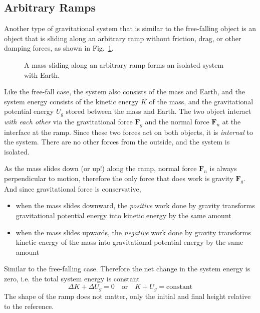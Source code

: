 \subsection{Arbitrary Ramps}
Another type of gravitational system that is similar to the free-falling
object is an object that is sliding along an arbitrary ramp without friction,
drag, or other damping forces, as shown in Fig.~\ref{fig:ramp-system}.
\begin{figure}[ht]
  \centering
  \caption{A mass sliding along an arbitrary ramp forms an isolated system
    with Earth.}
  \label{fig:ramp-system}
\end{figure}
Like the free-fall case, the system also consists of the mass and Earth, and
the system energy consists of the kinetic energy $K$ of the mass, and the
gravitational potential energy $U_g$ stored between the mass and Earth. The
two object interact \emph{with each other} via the gravitational force
$\bm F_g$ and the normal force $\bm F_n$ at the interface at the ramp.
Since these two forces act on both objects, it is \emph{internal} to the
system. There are no other forces from the outside, and the system is isolated.

As the mass slides down (or up!) along the ramp, normal force $\bm F_n$ is
always perpendicular to motion, therefore the only force that does work is
gravity $\bm F_g$. And since gravitational force is conservative,
\begin{itemize}[leftmargin=15pt]
\item when the mass slides downward, the \emph{positive} work done by gravity
  transforms gravitational potential energy into kinetic energy by the same
  amount
\item when the mass slides upwards, the \emph{negative} work done by gravity
  transforms kinetic energy of the mass into gravitational potential energy by
  the same amount
\end{itemize}
Similar to the free-falling case. Therefore the net change in the system energy
is zero, i.e. the total system energy is constant
\begin{equation}
  \Delta K + \Delta U_g=0\quad\text{or}\quad
  K+U_g=\text{constant}
\end{equation}
The shape of the ramp does not matter, only the initial and final height
relative to the reference.

